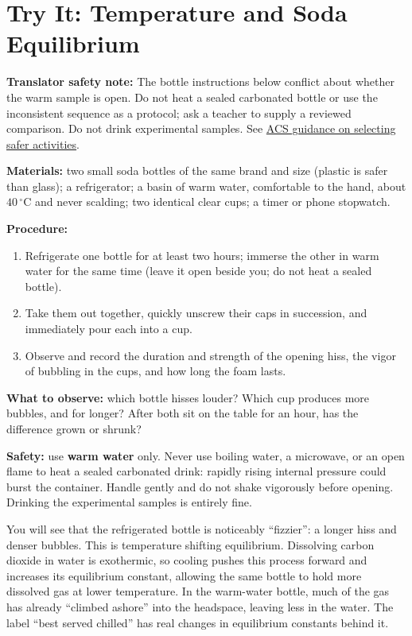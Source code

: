 \section{Try It: Temperature and Soda Equilibrium}

\textbf{Translator safety note:} The bottle instructions below conflict about whether the warm sample is open. Do not heat a sealed carbonated bottle or use the inconsistent sequence as a protocol; ask a teacher to supply a reviewed comparison. Do not drink experimental samples. See \href{https://institute.acs.org/acs-center/lab-safety/education-training/safer-experiments.html}{ACS guidance on selecting safer activities}.

\begin{shiyan}
\textbf{Materials:} two small soda bottles of the same brand and size (plastic is safer than glass); a refrigerator; a basin of warm water, comfortable to the hand, about $40\,^{\circ}\mathrm{C}$ and never scalding; two identical clear cups; a timer or phone stopwatch.

\textbf{Procedure:}
\begin{enumerate}[itemsep=1pt]
\item Refrigerate one bottle for at least two hours; immerse the other in warm water for the same time (leave it open beside you; do not heat a sealed bottle).
\item Take them out together, quickly unscrew their caps in succession, and immediately pour each into a cup.
\item Observe and record the duration and strength of the opening hiss, the vigor of bubbling in the cups, and how long the foam lasts.
\end{enumerate}

\textbf{What to observe:} which bottle hisses louder? Which cup produces more bubbles, and for longer? After both sit on the table for an hour, has the difference grown or shrunk?

\textbf{Safety:} use \textbf{warm water} only. Never use boiling water, a microwave, or an open flame to heat a sealed carbonated drink: rapidly rising internal pressure could burst the container. Handle gently and do not shake vigorously before opening. Drinking the experimental samples is entirely fine.
\end{shiyan}

You will see that the refrigerated bottle is noticeably ``fizzier'': a longer hiss and denser bubbles. This is temperature shifting equilibrium. Dissolving carbon dioxide in water is exothermic, so cooling pushes this process forward and increases its equilibrium constant, allowing the same bottle to hold more dissolved gas at lower temperature. In the warm-water bottle, much of the gas has already ``climbed ashore'' into the headspace, leaving less in the water. The label ``best served chilled'' has real changes in equilibrium constants behind it.

